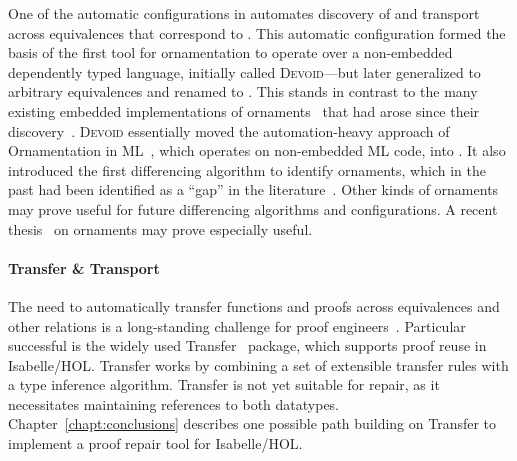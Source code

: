 One of the automatic configurations in \toolnamec automates discovery of and transport across equivalences
that correspond to .
This automatic configuration formed the basis of the first tool for ornamentation to operate over a non-embedded dependently typed language,
initially called \textsc{Devoid}---but later generalized to arbitrary equivalences and renamed to \toolnamec.
This stands in contrast to the many existing embedded implementations of 
ornaments~\cite{Dagand:2013:CTO:2591370.2591396, ko2013relational, dagand2014transporting, ko2016programming, dagand2017essence}
that had arose since their discovery~\cite{mcbride}.
\textsc{Devoid} essentially moved the automation-heavy approach of Ornamentation in ML~\cite{Williams2017},
which operates on non-embedded ML code, into .
It also introduced the first differencing algorithm to identify ornaments, which in the past 
had been identified as a ``gap'' in the literature~\cite{ko2016programming}.
Other kinds of ornaments may prove useful for future \toolnamec differencing algorithms and configurations.
A recent thesis~\cite{williamsphd} on ornaments may prove especially useful.

\paragraph{Transfer \& Transport}
The need to automatically transfer functions and proofs across equivalences and other relations is a long-standing challenge for proof 
engineers~\cite{magaud2000changing, Barthe2001, magaud2003changing}.
Particular successful is the widely used Transfer~\cite{Huffman2013} package, which supports proof reuse in Isabelle/HOL. %
Transfer works by combining a set of extensible transfer rules with a type inference algorithm.
Transfer is not yet suitable for repair, as it necessitates maintaining references to both datatypes.
Chapter~\ref{chapt:conclusions} describes one possible path building on Transfer to implement a proof repair tool for Isabelle/HOL.

